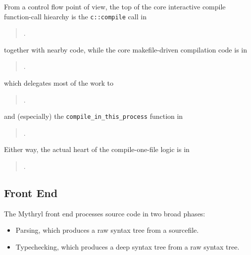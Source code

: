From a control flow point of view, the top of the core 
interactive compile function-call hiearchy is the {\tt c::compile} 
call in

\begin{quote}
.
\end{quote}

together with nearby code, while the core makefile-driven 
compilation code is in

\begin{quote}
.
\end{quote}

which delegates most of the work to

\begin{quote}
.
\end{quote}

and (especially) the {\tt compile\_in\_this\_process} function in

\begin{quote}
.
\end{quote}

Either way, the actual heart of the compile-one-file logic 
is in

\begin{quote}
.
\end{quote}

\cutend*




\subsection{Front End}
\label{section:compiler:frontend}

The Mythryl front end processes source code in two broad 
phases:

\begin{itemize}
\item Parsing, which produces a raw syntax tree from a sourcefile.
\item Typechecking, which produces a deep syntax tree from a raw syntax tree.
\end{itemize}

